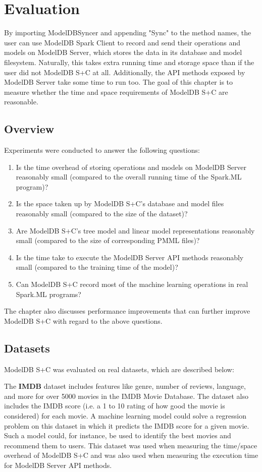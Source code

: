 \chapter{Evaluation}
By importing ModelDBSyncer and appending "Sync" to the method names, the user
can use ModelDB Spark Client to record and send their operations and models
on ModelDB Server, which stores the data in its database and model filesystem.
Naturally, this takes extra running time and storage space than if the user did
not ModelDB S+C at all. Additionally, the API methods exposed by ModelDB Server
take some time to run too. The goal of this chapter is to measure whether the time
and space requirements of ModelDB S+C are reasonable.


\section{Overview}
Experiments were conducted to answer the following questions:

\begin{enumerate}
\item Is the time overhead of storing operations and models on ModelDB Server reasonably small (compared to
the overall running time of the Spark.ML program)?
\item Is the space taken up by ModelDB S+C's database and model files reasonably small (compared
to the size of the dataset)?
\item Are ModelDB S+C's tree model and linear model representations reasonably small (compared 
to the size of corresponding PMML files)?
\item Is the time take to execute the ModelDB Server API methods reasonably small (compared
to the training time of the model)?
\item Can ModelDB S+C record most of the machine learning operations in real Spark.ML programs?
\end{enumerate}

The chapter also discusses performance improvements that can further improve ModelDB S+C with
regard to the above questions.

\section{Datasets}
ModelDB S+C was evaluated on real datasets, which are described below:

The \textbf{IMDB} dataset \cite{imdb} includes features like genre, number of
reviews, language, and more for over 5000 movies in the IMDB Movie Database. The dataset
also includes the IMDB score (i.e. a 1 to 10 rating of how good the movie is considered)
for each movie. A machine learning model could solve a regression problem on this
dataset in which it predicts the IMDB score for a given movie. Such a model could, for instance,
be used to identify the best movies and recommend them to users. This dataset
was used when measuring the time/space overhead of ModelDB S+C and was also used
when measuring the execution time for ModelDB Server API methods.

